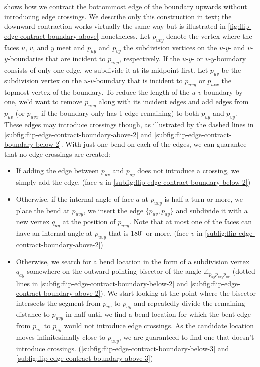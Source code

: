  shows how we contract the bottommost edge of the boundary upwards without introducing edge crossings. We describe only this construction in text; the downward contraction works virtually the same way but is illustrated in \cref{fig:flip-edge-contract-boundary-above} nonetheless. Let $p_{uvy}$ denote the vertex where the faces $u$, $v$, and $y$ meet and $p_{uy}$ and $p_{vy}$ the subdivision vertices on the $u$-$y$- and $v$-$y$-boundaries that are incident to $p_{uvy}$, respectively. If the $u$-$y$- or $v$-$y$-boundary consists of only one edge, we subdivide it at its midpoint first. Let $p_{uv}$ be the subdivision vertex on the $u$-$v$-boundary that is incident to $p_{uvy}$ or $p_{uvx}$ the topmost vertex of the boundary. To reduce the length of the $u$-$v$ boundary by one, we'd want to remove $p_{uvy}$ along with its incident edges and add edges from $p_{uv}$ (or $p_{uvx}$ if the boundary only has 1 edge remaining) to both $p_{uy}$ and $p_{vy}$. These edges may introduce crossings though, as illustrated by the dashed lines in \cref{subfig:flip-edge-contract-boundary-above-2} and \cref{subfig:flip-edge-contract-boundary-below-2}. With just one bend on each of the edges, we can guarantee that no edge crossings are created:

\begin{itemize}
	\item If adding the edge between $p_{uv}$ and $p_{ay}$ does not introduce a crossing, we simply add the edge. (face $u$ in \cref{subfig:flip-edge-contract-boundary-below-2})
	\item Otherwise, if the internal angle of face $a$ at $p_{uvy}$ is half a turn or more, we place the bend at $p_{uvy}$, \ie{} we insert the edge $\{p_{uv},p_{ay}\}$ and subdivide it with a new vertex $q_{ay}$ at the position of $p_{uvy}$. Note that at most one of the faces can have an internal angle at $p_{uvy}$ that is $180^\circ$ or more. (face $v$ in \cref{subfig:flip-edge-contract-boundary-above-2})
	\item Otherwise, we search for a bend location in the form of a subdivision vertex $q_{ay}$ somewhere on the outward-pointing bisector of the angle $\angle_{p_{ay}p_{uvy}p_{uv}}$ (dotted lines in \cref{subfig:flip-edge-contract-boundary-below-2} and \cref{subfig:flip-edge-contract-boundary-above-2}). We start looking at the point where the bisector intersects the segment from $p_{uv}$ to $p_{ay}$ and repeatedly divide the remaining distance to $p_{uvy}$ in half until we find a bend location for which the bent edge from $p_{uv}$ to $p_{ay}$ would not introduce edge crossings. As the candidate location moves infinitesimally close to $p_{uvy}$, we are guaranteed to find one that doesn't introduce crossings. (\cref{subfig:flip-edge-contract-boundary-below-3} and \cref{subfig:flip-edge-contract-boundary-above-3})
\end{itemize}

